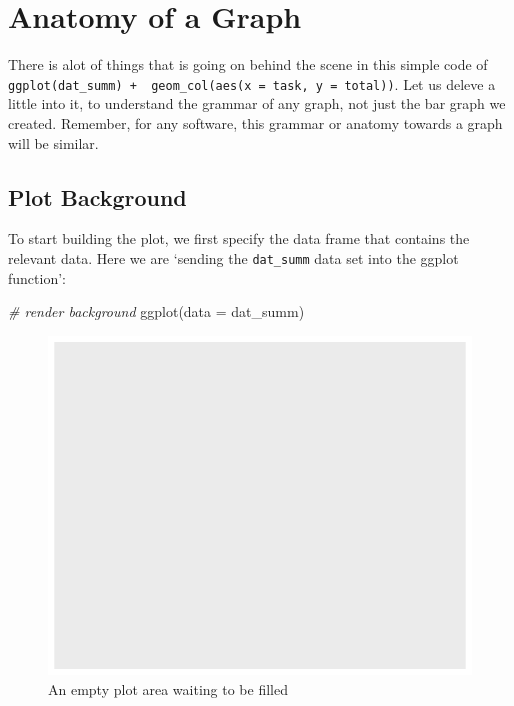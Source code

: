\documentclass[
]{book}
\newenvironment{Shaded}{\begin{snugshade}}{\end{snugshade}}
\newcommand{\AttributeTok}[1]{\textcolor[rgb]{0.77,0.63,0.00}{#1}}
\newcommand{\CommentTok}[1]{\textcolor[rgb]{0.56,0.35,0.01}{\textit{#1}}}
\newcommand{\FunctionTok}[1]{\textcolor[rgb]{0.00,0.00,0.00}{#1}}
\newcommand{\NormalTok}[1]{#1}
\begin{document}
\hypertarget{BAR-GRAPH-ANATOMY}{%
\section{Anatomy of a Graph}\label{BAR-GRAPH-ANATOMY}}

There is alot of things that is going on behind the scene in this simple code of \texttt{ggplot(dat\_summ)\ +\ \ geom\_col(aes(x\ =\ task,\ y\ =\ total))}. Let us deleve a little into it, to understand the grammar of any graph, not just the bar graph we created. Remember, for any software, this grammar or anatomy towards a graph will be similar.

\hypertarget{BAR-GRAPH-ANATOMY-BACKGROUND}{%
\subsection{Plot Background}\label{BAR-GRAPH-ANATOMY-BACKGROUND}}

To start building the plot, we first specify the data frame that contains the relevant data. Here we are `sending the \texttt{dat\_summ} data set into the ggplot function':

\begin{Shaded}
\begin{Highlighting}[]
\CommentTok{\# render background}
\FunctionTok{ggplot}\NormalTok{(}\AttributeTok{data =}\NormalTok{ dat\_summ)}
\end{Highlighting}
\end{Shaded}

\begin{figure}

{\centering \includegraphics{se201_stats_book_files/figure-latex/FIG-BAR-GRAPH-BACKGROUND-1} 

}

\caption[An empty plot area waiting to be filled]{An empty plot area waiting to be filled}\label{fig:FIG-BAR-GRAPH-BACKGROUND}
\end{figure}
\end{document}
